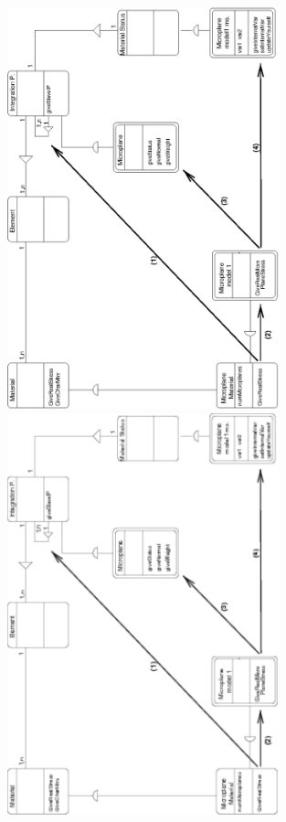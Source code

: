 \documentclass[a4paper]{article}
\begin{document}
\begin{figure}[tb]
\begin{htmlonly}
  \centerline{\includegraphics[width=0.7\textwidth]{microp.eps}}
\end{htmlonly}
\ifpdf
\centerline{\includegraphics[width=0.7\textwidth]{microp.pdf}}

\end{figure}
\end{document}
